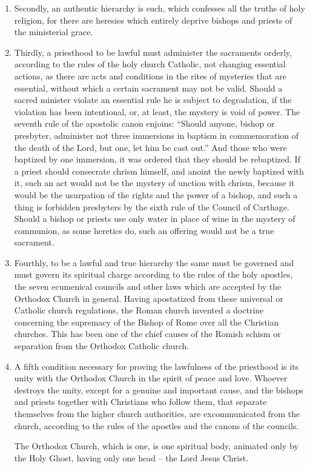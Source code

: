 \begin{enumerate}
    \item Secondly, an authentic hierarchy is such, 
    which confesses all the truths of holy religion, 
    for there are heresies which entirely deprive 
    bishops and priests of the ministerial grace. 

    \item Thirdly, a priesthood to be lawful must 
    administer the sacraments orderly, according 
    to the rules of the holy church Catholic, not 
    changing essential actions, as there are acts and 
    conditions in the rites of mysteries that are essential,
    without which a certain sacrament may 
    not be valid. Should a sacred minister violate 
    an essential rule he is subject to degradation, if 
    the violation has been intentional, or, at least, 
    the mystery is void of power. The seventh 
    rule of the apostolic canon enjoins: ``Should 
    anyone, bishop or presbyter, administer not 
    three immersions in baptism in commemoration 
    of the death of the Lord, but one, let him be cast 
    out.'' And those who were baptized by one 
    immersion, it was ordered that they should be 
    rebaptized. If a priest should consecrate 
    chrism himself, and anoint the newly baptized 
    with it, such an act would not be the mystery of 
    unction with chrism, because it would be the 
    usurpation of the rights and the power of a 
    bishop, and such a thing is forbidden presbyters
    by the sixth rule of the Council of Carthage.
    Should a bishop or priests use only water 
    in place of wine in the mystery of communion, 
    as some heretics do, such an offering would not 
    be a true sacrament. 

    \item Fourthly, to be a lawful and true hierarchy
    the same must be governed and must govern 
    its spiritual charge according to the rules of the 
    holy apostles, the seven ecumenical councils 
    and other laws which are accepted by the 
    Orthodox Church in general. Having apostatized
    from these universal or Catholic church 
    regulations, the Roman church invented a 
    doctrine concerning the supremacy of the 
    Bishop of Rome over all the Christian churches. 
    This has been one of the chief causes of the 
    Romish schism or separation from the Orthodox
    Catholic church. 

    \item A fifth condition necessary for proving the 
    lawfulness of the priesthood is its unity with 
    the Orthodox Church in the spirit of peace and 
    love. Whoever destroys the unity, except for 
    a genuine and important cause, and the bishops 
    and priests together with Christians who follow 
    them, that separate themselves from the higher 
    church authorities, are excommunicated from 
    the church, according to the rules of the 
    apostles and the canons of the councils. 

    The Orthodox Church, which is one, is one 
    spiritual body, animated only by the Holy 
    Ghost, having only one head -- the Lord Jesus 
    Christ. 
\end{enumerate}

